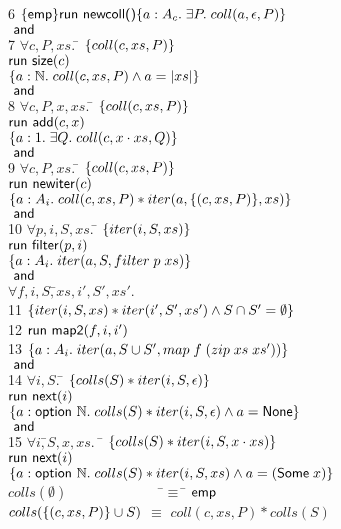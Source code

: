 \documentclass[preprint,natbib]{sigplanconf}
\begin{document}
{\begin{tabbing}
6 \>
\> $\{{\mathsf{emp}}\}{\mbox{\textsf{{run }}}{\mbox{\textsf{{newcoll()}}}}}\{{a:A_c}.\;{\exists P.\; coll(a, \epsilon,P)}\}$ \\
\>
\> $\mbox{\textsf{{ and }}}$ \\
7 \>
\> $\forall c, P, xs.\;$\=
         $\{{coll(c, xs, P)}\}$\\
\>\> \>  $\mbox{\textsf{{run }}}{\mbox{\textsf{{size}}}(c)}$ \\
\>\> \>  $\{{a:\mathbb{N}.\; coll(c, xs, P) \land a = |xs|}\}$ \\
\> 
\> $\mbox{\textsf{{ and }}}$ \\
8 \> \> $\forall c, P, x, xs.\;$\=
               $\{{coll(c, xs, P)}\}$ \\
\>\>\>         $\mbox{\textsf{{run }}}{\mbox{\textsf{{add}}}(c, x)}$\\
\>\>\>         $\{{a:1.\; \exists Q.\; coll(c, x\cdot xs, Q)}\}$ \\
\>
\> $\mbox{\textsf{{ and }}}$ \\
9 \>
\> $\forall c, P, xs.\;$\=
      $\{{coll(c, xs, P)}\}$ \\
\>\>\>$\mbox{\textsf{{run }}}{\mbox{\textsf{{newiter}}}(c)}$\\
\>\>\>$\{{a:A_i.\; coll(c, xs, P) * iter(a, \{{(c, xs, P)}\}, xs)}\}$ \\
\>
\> $\mbox{\textsf{{ and }}}$ \\
10 \>
\> $\forall p, i, S, xs.\;$\=
         $\{{iter(i, S, xs)}\}$ \\
\>\>\>   $\mbox{\textsf{{run }}}{\mbox{\textsf{{filter}}}(p, i)}$\\
\>\>\>   $\{{a:A_i.\; iter(a, S, filter\; p\;xs)}\}$ \\
 \> 
\> $\mbox{\textsf{{ and }}}$ \\
 \> 
\> $\forall f, i, S,$\=$ xs, i', S', xs'.\;$ \\
11 \> \> \> 
     $\{{iter(i, S, xs) * iter(i', S', xs') \land S \cap S' = \emptyset}\}$ \\
12 \> \> \> $\mbox{\textsf{{run }}}{\mbox{\textsf{{map2}}}(f, i, i')}$ \\
13 \> \> \> $\{{a:A_i.\; iter(a, S \cup S', map\;f\;(zip\;xs\;xs'))}\}$ \\
\>
\> $\mbox{\textsf{{ and }}}$ \\
14 \>
\> $\forall i, S.\;$\=
      $\{{colls(S) * iter(i, S, \epsilon)}\}$\\  
\>\>\>$\mbox{\textsf{{run }}}{\mbox{\textsf{{next}}}(i)}$ \\
\>\>\>$\{{a:\mbox{\textsf{{option }}}{\mathbb{N}}.\; colls(S) * iter(i, S, \epsilon) \land a = \mbox{\textsf{{None}}}}\}$ \\
\>
\> $\mbox{\textsf{{ and }}}$ \\
15 \> \> $\forall i,$\=$ S, x, xs.\;$ \= 
      $\{{colls(S) * iter(i, S, x \cdot xs)}\}$\\
\>\>\>$\mbox{\textsf{{run }}}{\mbox{\textsf{{next}}}(i)}$\\
\>\>\>$\{{a:\mbox{\textsf{{option }}}{\mathbb{N}}.\; 
              colls(S) * iter(i, S, xs) \land a = (\mbox{\textsf{{Some}}}\;x)}\}$ 
\\[0.5em]
$colls(\emptyset) \qquad\qquad\qquad\;\;$ \=$\equiv\;$\= $\mathsf{emp}$ \\
$colls(\{{(c,xs,P)}\} \cup S)$ \> $\equiv$ \> $coll(c, xs, P) * colls(S)$ \\
\end{tabbing}
}
\end{document}
